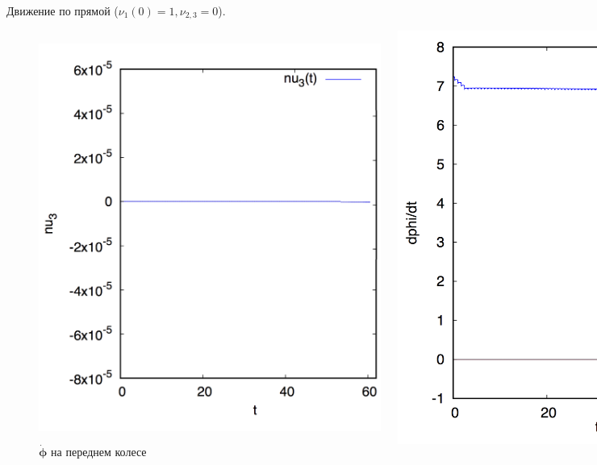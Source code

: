 \documentclass{beamer}
\begin{document}
\begin{frame}{Движение по прямой ($\nu_1(0) = 1, \nu_{2,3} = 0$).}
\begin{figure}[H]
\begin{columns}
                \vspace{-15pt}
                \caption{Траектория}
                \centering
                \includegraphics[width=0.8\linewidth]{content/pic/straight_60/nu3.png}
                \vspace{-15pt}
                \caption{Угловая скорость экипажа}
                \centering
                \includegraphics[width=0.8\linewidth]{content/pic/straight_60/nus1.png}
                \vspace{-15pt}
                \caption{$\dot{\mathbf{\phi}}$ на переднем колесе}
        \end{columns}
    \end{figure}
\end{frame}
\end{document}
